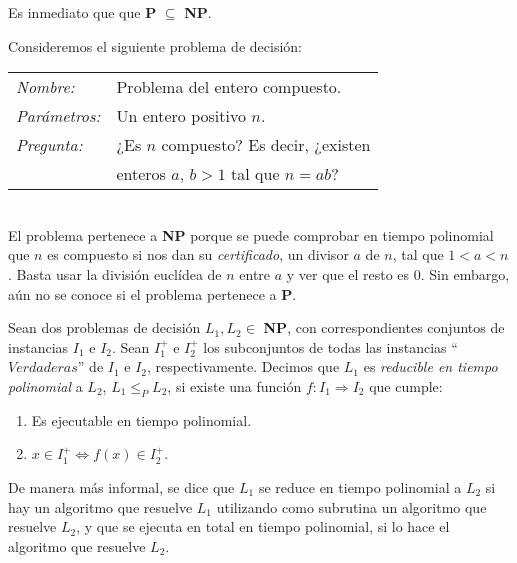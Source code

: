 Es inmediato que  que \textbf{P} $\subseteq$ \textbf{NP}.%

\begin{example}
	Consideremos el siguiente problema de decisión:

	\begin{tabular}{|ll}
		\textit{Nombre:} & Problema del entero compuesto. \\
		\textit{Parámetros:} & Un entero positivo $n$. \\
		\textit{Pregunta:} & ¿Es $n$ compuesto? Es decir, ¿existen \\
		&  enteros $a$, $b > 1$ tal que $n=ab$? \\
	\end{tabular}
	\\

	El problema pertenece a \textbf{NP} porque se puede comprobar en tiempo polinomial que
	$n$ es compuesto si nos dan su \textit{certificado}, un divisor $a$ de $n$, tal que $1 < a < n$.
	Basta usar la división euclídea de $n$ entre $a$ y ver que el resto es $0$. Sin embargo,
	aún no se conoce si el problema pertenece a \textbf{P}.
\end{example}


\hfil

\begin{definition}
	\label{reducePoly:def}
	Sean dos problemas de decisión $L_1, L_2 \in $ \textbf{NP}, con correspondientes
	conjuntos de instancias $I_1$ e $I_2$. Sean $I_1^+$ e $I_2^+$ los subconjuntos
	de todas las instancias ``$Verdaderas$'' de $I_1$ e $I_2$, respectivamente.
	Decimos que $L_1$ es \textit{reducible en tiempo polinomial} a $L_2$, $L_1
	\leq_P L_2$, si existe una función $f:I_1 \Rightarrow I_2$ que cumple:

	\begin{enumerate}
		\item Es ejecutable en tiempo polinomial.
		\item $x \in I_1^+  \Leftrightarrow  f(x) \in I_2^+ $.
	\end{enumerate}
\end{definition}

\hfil

De manera más informal, se dice que $L_1$ se reduce en tiempo polinomial a
$L_2$ si hay un algoritmo que resuelve $L_1$ utilizando como subrutina un
algoritmo que resuelve $L_2$, y que se ejecuta en total en tiempo polinomial,
si lo hace el algoritmo que resuelve $L_2$.

